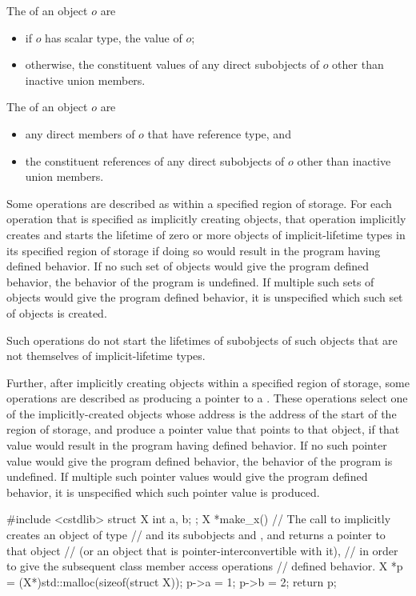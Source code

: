 \pnum
The  of an object $o$ are
\begin{itemize}
\item
if $o$ has scalar type, the value of $o$;
\item
otherwise, the constituent values of any direct subobjects of $o$
other than inactive union members.
\end{itemize}
The  of an object $o$ are
\begin{itemize}
\item
any direct members of $o$ that have reference type, and
\item
the constituent references of any direct subobjects of $o$
other than inactive union members.
\end{itemize}

\pnum
Some operations are described as
within a specified region of storage.
For each operation that is specified as implicitly creating objects,
that operation implicitly creates and starts the lifetime of
zero or more objects of implicit-lifetime types
in its specified region of storage
if doing so would result in the program having defined behavior.
If no such set of objects would give the program defined behavior,
the behavior of the program is undefined.
If multiple such sets of objects would give the program defined behavior,
it is unspecified which such set of objects is created.
\begin{note}
Such operations do not start the lifetimes of subobjects of such objects
that are not themselves of implicit-lifetime types.
\end{note}

\pnum
Further, after implicitly creating objects within a specified region of storage,
some operations are described as producing a pointer to a
.
These operations select one of the implicitly-created objects
whose address is the address of the start of the region of storage,
and produce a pointer value that points to that object,
if that value would result in the program having defined behavior.
If no such pointer value would give the program defined behavior,
the behavior of the program is undefined.
If multiple such pointer values would give the program defined behavior,
it is unspecified which such pointer value is produced.

\pnum
\begin{example}
\begin{codeblock}
#include <cstdlib>
struct X { int a, b; };
X *make_x() {
  // The call to  implicitly creates an object of type 
  // and its subobjects  and , and returns a pointer to that  object
  // (or an object that is pointer-interconvertible with it),
  // in order to give the subsequent class member access operations
  // defined behavior.
  X *p = (X*)std::malloc(sizeof(struct X));
  p->a = 1;
  p->b = 2;
  return p;
}
\end{codeblock}
\end{example}

